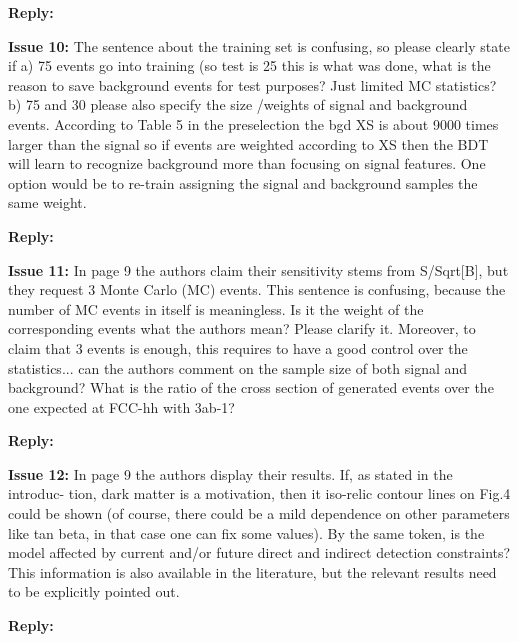 \documentclass{article}
\begin{document}
\noindent\textbf{Reply:} 

\noindent\textbf{Issue 10:} The sentence about the training set is confusing, so
please clearly state if a) 75 %
events go into training (so test is 25 %
this is what was done, what is the reason to save background events for test
purposes? Just limited MC statistics?  b) 75%
and 30%
please also specify the size /weights of signal and background events.
According to Table 5 in the preselection the bgd XS is about 9000 times larger
than the signal so if events are weighted according to XS then the BDT will
learn to recognize background more than focusing on signal features. One option
would be to re-train assigning the signal and background samples the same
weight.

\noindent\textbf{Reply:} 

\noindent\textbf{Issue 11:} In page 9 the authors claim their sensitivity stems
from S/Sqrt[B], but they request 3 Monte Carlo (MC) events. This sentence is
confusing, because the number of MC events in itself is meaningless. Is it the
weight of the corresponding events what the authors mean? Please clarify it.
Moreover, to claim that 3 events is enough, this requires to have a good
control over the statistics... can the authors comment on the sample size of
both signal and background? What is the ratio of the cross section of generated
events over the one expected at FCC-hh with 3ab-1?

\noindent\textbf{Reply:} 

\noindent\textbf{Issue 12:} In page 9 the authors display their results. If, as
stated in the introduc- tion, dark matter is a motivation, then it iso-relic
contour lines on Fig.4 could be shown (of course, there could be a mild
dependence on other parameters like tan beta, in that case one can fix some
values). By the same token, is the model affected by current and/or future
direct and indirect detection constraints? This information is also available
in the literature, but the relevant results need to be explicitly pointed out.

\noindent\textbf{Reply:} 
\end{document}

